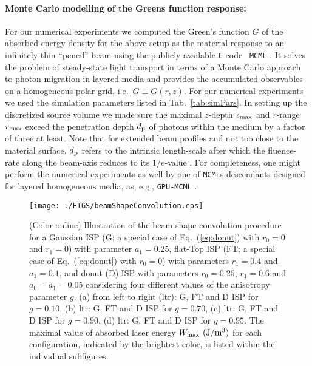 \documentclass[12pt]{iopart}
\begin{document}
\paragraph{Monte Carlo modelling of the Greens function response:}
For our numerical experiments we computed the Green's function $G$ of the
absorbed energy density for the above setup as the material response to an
infinitely thin ``pencil'' beam using the publicly available {\tt C} code {\tt
MCML} \cite{MCML:1995}. It solves the problem of steady-state light transport
in terms of a Monte Carlo approach to photon migration in layered media and
provides the accumulated observables on a homogeneous polar grid, i.e.\
$G\equiv G(r,z)$.  
For our numerical experiments we used the simulation parameters listed in
Tab.~\ref{tab:simPars}. In setting up the discretized source volume we made
sure the maximal $z$-depth $z_{\rm max}$ and $r$-range $r_{\rm max}$ exceed the
penetration depth $d_{\rm p}$ of photons within the medium by a factor of three
at least. Note that for extended beam profiles and not too close to the
material surface, $d_{\rm p}$ refers to the intrinsic length-scale after which
the fluence-rate along the beam-axis reduces to its $1/e$-value
\cite{MCML:1995,Wilson:1990}.  For completeness, one might perform the
numerical experiments as well by one of {\tt MCML}s descendants designed for
layered homogeneous media, as, e.g., {\tt GPU-MCML} \cite{Alerstam:2010}.

%
%
\begin{figure}[t!]
\centerline{\texttt{[image: ./FIGS/beamShapeConvolution.eps]} } 
\caption{(Color online) Illustration of the beam shape convolution procedure
for a Gaussian ISP (G; a special case of Eq.~(\ref{eq:donut}) with $r_0=0$ and
$r_1=0$) with parameter $a_1=0.25$, flat-Top ISP (FT; a special 
case of Eq.~(\ref{eq:donut}) with $r_0=0$) with parameters $r_1=0.4$ and $a_1=0.1$, 
and donut (D) ISP with parameters $r_0=0.25$, $r_1=0.6$ and $a_0=a_1=0.05$ 
considering four different values of the anisotropy parameter $g$.
(a) from left to right (ltr): G, FT and D ISP for $g=0.10$, 
(b) ltr: G, FT and D ISP for $g=0.70$, 
(c) ltr: G, FT and D ISP for $g=0.90$, 
(d) ltr: G, FT and D ISP for $g=0.95$. 
The maximal value of absorbed laser energy $W_{\rm max}~ ({\rm J/m^3})$
for each configuration, indicated by the brightest color, is listed within the
individual subfigures.
}
\label{fig:beamShapes}
\end{figure}
\end{document}
